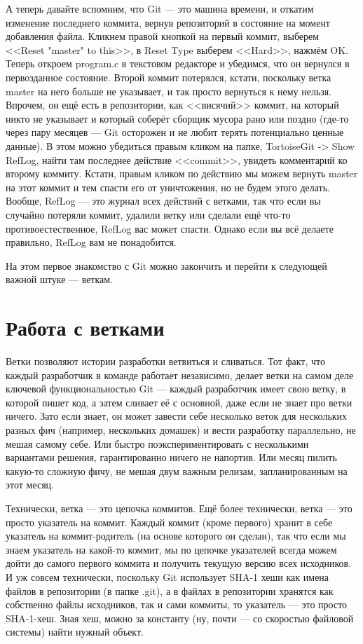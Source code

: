 \documentclass{../../text-style}
\begin{document}
А теперь давайте вспомним, что Git --- это машина времени, и откатим изменение последнего коммита, вернув репозиторий в состояние на момент добавления файла. Кликнем правой кнопкой на первый коммит, выберем <<Reset "master" to this>>, в Reset Type выберем <<Hard>>, нажмём OK. Теперь откроем program.c в текстовом редакторе и убедимся, что он вернулся в первозданное состояние. Второй коммит потерялся, кстати, поскольку ветка master на него больше не указывает, и так просто вернуться к нему нельзя. Впрочем, он ещё есть в репозитории, как <<висячий>> коммит, на который никто не указывает и который соберёт сборщик мусора рано или поздно (где-то через пару месяцев --- Git осторожен и не любит терять потенциально ценные данные). В этом можно убедиться правым кликом на папке, TortoiseGit -> Show RefLog, найти там последнее действие <<commit>>, увидеть комментарий ко второму коммиту. Кстати, правым кликом по действию мы можем вернуть master на этот коммит и тем спасти его от уничтожения, но не будем этого делать. Вообще, RefLog --- это журнал всех действий с ветками, так что если вы случайно потеряли коммит, удалили ветку или сделали ещё что-то противоестественное, RefLog вас может спасти. Однако если вы всё делаете правильно, RefLog вам не понадобится.

На этом первое знакомство с Git можно закончить и перейти к следующей важной штуке --- веткам.

\section{Работа с ветками}

Ветки позволяют истории разработки ветвиться и сливаться. Тот факт, что каждый разработчик в команде работает независимо, делает ветки на самом деле ключевой функциональностью Git --- каждый разработчик имеет свою ветку, в которой пишет код, а затем сливает её с основной, даже если не знает про ветки ничего. Зато если знает, он может завести себе несколько веток для нескольких разных фич (например, нескольких домашек) и вести разработку параллельно, не мешая самому себе. Или быстро поэкспериментировать с несколькими вариантами решения, гарантированно ничего не напортив. Или месяц пилить какую-то сложную фичу, не мешая двум важным релизам, запланированным на этот месяц.

Технически, ветка --- это цепочка коммитов. Ещё более технически, ветка --- это просто указатель на коммит. Каждый коммит (кроме первого) хранит в себе указатель на коммит-родитель (на основе которого он сделан), так что если мы знаем указатель на какой-то коммит, мы по цепочке указателей всегда можем дойти до самого первого коммита и получить текущую версию всех исходников. И уж совсем технически, поскольку Git использует SHA-1 хеши как имена файлов в репозитории (в папке .git), а в файлах в репозитории хранятся как собственно файлы исходников, так и сами коммиты, то указатель --- это просто SHA-1-хеш. Зная хеш, можно за константу (ну, почти --- со скоростью файловой системы) найти нужный объект.
\end{document}
